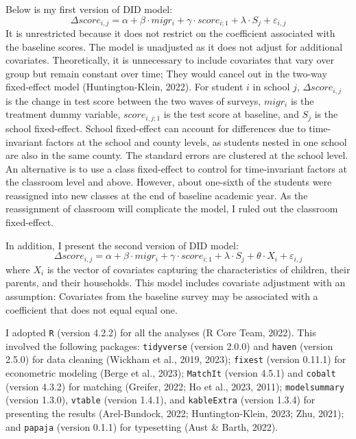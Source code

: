 \documentclass[
  man,floatsintext]{apa7}
\begin{document}
Below is my first version of DID model: \[\Delta score_{i,j} = \alpha + \beta \cdot migr_{i} + \gamma \cdot score_{i;1} + \lambda \cdot S_{j} + \varepsilon_{i,j}\] It is unrestricted because it does not restrict on the coefficient associated with the baseline scores. The model is unadjusted as it does not adjust for additional covariates. Theoretically, it is unnecessary to include covariates that vary over group but remain constant over time; They would cancel out in the two-way fixed-effect model (Huntington-Klein, 2022). For student \(i\) in school \(j\), \(\Delta score_{i,j}\) is the change in test score between the two waves of surveys, \(migr_{i}\) is the treatment dummy variable, \(score_{i,j;1}\) is the test score at baseline, and \(S_{j}\) is the school fixed-effect. School fixed-effect can account for differences due to time-invariant factors at the school and county levels, as students nested in one school are also in the same county. The standard errors are clustered at the school level. An alternative is to use a class fixed-effect to control for time-invariant factors at the classroom level and above. However, about one-sixth of the students were reassigned into new classes at the end of baseline academic year. As the reassignment of classroom will complicate the model, I ruled out the classroom fixed-effect.

In addition, I present the second version of DID model: \[\Delta score_{i,j} = \alpha + \beta \cdot migr_{i} + \gamma \cdot score_{i;1} + \lambda \cdot S_{j} + \theta \cdot X_{i} + \varepsilon_{i,j}\] where \(X_{i}\) is the vector of covariates capturing the characteristics of children, their parents, and their households. This model includes covariate adjustment with an assumption: Covariates from the baseline survey may be associated with a coefficient that does not equal equal one.

I adopted \texttt{R} (version 4.2.2) for all the analyses (R Core Team, 2022). This involved the following packages: \texttt{tidyverse} (version 2.0.0) and \texttt{haven} (version 2.5.0) for data cleaning (Wickham et al., 2019, 2023); \texttt{fixest} (version 0.11.1) for econometric modeling (Berge et al., 2023); \texttt{MatchIt} (version 4.5.1) and \texttt{cobalt} (version 4.3.2) for matching (Greifer, 2022; Ho et al., 2023, 2011); \texttt{modelsummary} (version 1.3.0), \texttt{vtable} (version 1.4.1), and \texttt{kableExtra} (version 1.3.4) for presenting the results (Arel-Bundock, 2022; Huntington-Klein, 2023; Zhu, 2021); and \texttt{papaja} (version 0.1.1) for typesetting (Aust \& Barth, 2022).
\end{document}
